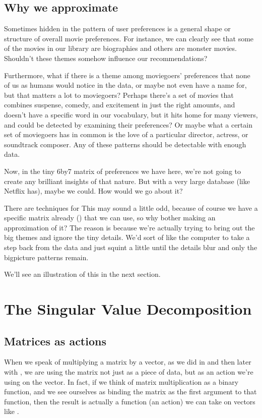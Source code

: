 \documentclass[letterpaper,10pt,english]{sphinxmanual}
\begin{document}
\subsection{Why we approximate}
\label{\detokenize{chapter-16-matrices:why-we-approximate}}
Sometimes hidden in the pattern of user preferences is a general shape or structure of overall movie preferences.  For instance, we can clearly see that some of the movies in our library are biographies and others are monster movies.  Shouldn’t these themes somehow influence our recommendations?

Furthermore, what if there is a theme among moviegoers’ preferences that none of us as humans would notice in the data, or maybe not even have a name for, but that matters a lot to moviegoers?  Perhaps there’s a set of movies that combines suspense, comedy, and excitement in just the right amounts, and doesn’t have a specific word in our vocabulary, but it hits home for many viewers, and could be detected by examining their preferences?  Or maybe what a certain set of moviegoers has in common is the love of a particular director, actress, or soundtrack composer.  Any of these patterns should be detectable with enough data.

Now, in the tiny 6\sphinxhyphen{}by\sphinxhyphen{}7 matrix of preferences we have here, we’re not going to create any brilliant insights of that nature.  But with a very large database (like Netflix has), maybe we could.  How would we go about it?

There are techniques for   This may sound a little odd, because of course we have a specific matrix already () that we can use, so why bother making an approximation of it?  The reason is because we’re actually trying to bring out the big themes and ignore the tiny details.  We’d sort of like the computer to take a step back from the data and just squint a little until the details blur and only the big\sphinxhyphen{}picture patterns remain.

We’ll see an illustration of this in the next section.


\section{The Singular Value Decomposition}
\label{\detokenize{chapter-16-matrices:the-singular-value-decomposition}}

\subsection{Matrices as actions}
\label{\detokenize{chapter-16-matrices:matrices-as-actions}}
When we speak of multiplying a matrix by a vector, as we did in  and then later with , we are using the matrix not just as a piece of data, but as an action we’re using on the vector.  In fact, if we think of matrix multiplication as a binary function, and we see ourselves as binding the matrix as the first argument to that function, then the result is actually a function (an action) we can take on vectors like .
\end{document}
